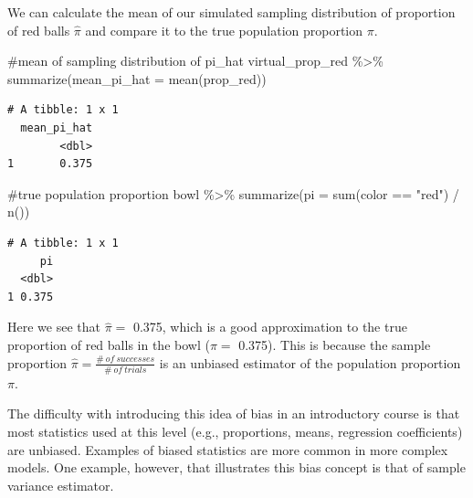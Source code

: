 \documentclass[
  letterpaper,
  DIV=11,
  numbers=noendperiod]{scrreprt}
\newenvironment{Shaded}{\begin{snugshade}}{\end{snugshade}}
\newcommand{\AttributeTok}[1]{\textcolor[rgb]{0.40,0.45,0.13}{#1}}
\newcommand{\CommentTok}[1]{\textcolor[rgb]{0.37,0.37,0.37}{#1}}
\newcommand{\FunctionTok}[1]{\textcolor[rgb]{0.28,0.35,0.67}{#1}}
\newcommand{\NormalTok}[1]{\textcolor[rgb]{0.00,0.23,0.31}{#1}}
\newcommand{\SpecialCharTok}[1]{\textcolor[rgb]{0.37,0.37,0.37}{#1}}
\newcommand{\StringTok}[1]{\textcolor[rgb]{0.13,0.47,0.30}{#1}}
\theoremstyle{definition}
\theoremstyle{remark}
\begin{document}
We can calculate the mean of our simulated sampling distribution of
proportion of red balls \(\hat{\pi}\) and compare it to the true
population proportion \(\pi\).

\begin{Shaded}
\begin{Highlighting}[]
\CommentTok{\#mean of sampling distribution of pi\_hat}
\NormalTok{virtual\_prop\_red }\SpecialCharTok{\%\textgreater{}\%} 
  \FunctionTok{summarize}\NormalTok{(}\AttributeTok{mean\_pi\_hat =} \FunctionTok{mean}\NormalTok{(prop\_red))}
\end{Highlighting}
\end{Shaded}

\begin{verbatim}
# A tibble: 1 x 1
  mean_pi_hat
        <dbl>
1       0.375
\end{verbatim}

\begin{Shaded}
\begin{Highlighting}[]
\CommentTok{\#true population proportion}
\NormalTok{bowl }\SpecialCharTok{\%\textgreater{}\%} 
  \FunctionTok{summarize}\NormalTok{(}\AttributeTok{pi =} \FunctionTok{sum}\NormalTok{(color }\SpecialCharTok{==} \StringTok{"red"}\NormalTok{) }\SpecialCharTok{/} \FunctionTok{n}\NormalTok{())}
\end{Highlighting}
\end{Shaded}

\begin{verbatim}
# A tibble: 1 x 1
     pi
  <dbl>
1 0.375
\end{verbatim}

Here we see that \(\hat{\pi}=\) 0.375, which is a good approximation to
the true proportion of red balls in the bowl (\(\pi =\) 0.375). This is
because the sample proportion
\(\hat{\pi} = \frac{\# \  of \ successes}{\# \ of \ trials}\) is an
unbiased estimator of the population proportion \(\pi\).

The difficulty with introducing this idea of bias in an introductory
course is that most statistics used at this level (e.g., proportions,
means, regression coefficients) are unbiased. Examples of biased
statistics are more common in more complex models. One example, however,
that illustrates this bias concept is that of sample variance estimator.
\end{document}
